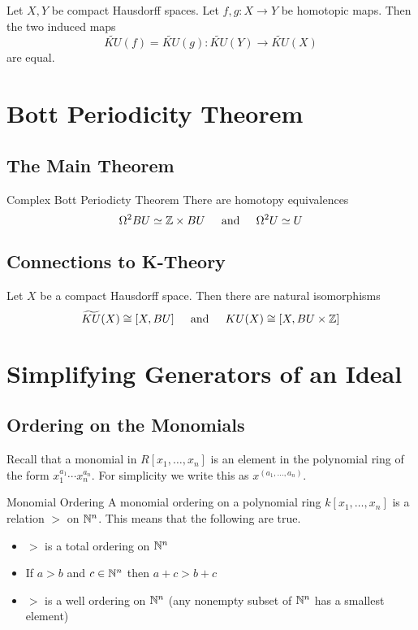 \documentclass[a4paper]{article}
\begin{document}
\begin{prp}{}{} Let $X,Y$ be compact Hausdorff spaces. Let $f,g:X\to Y$ be homotopic maps. Then the two induced maps $$\widetilde{KU}(f)=\widetilde{KU}(g):\widetilde{KU}(Y)\to\widetilde{KU}(X)$$ are equal. 
\end{prp}

\pagebreak
\section{Bott Periodicity Theorem}
\subsection{The Main Theorem}
\begin{thm}{Complex Bott Periodicty Theorem}{} There are homotopy equivalences $$\Omega^2 BU\simeq\mathbb{Z}\times BU\;\;\;\;\text{ and }\;\;\;\;\Omega^2 U\simeq U$$
\end{thm}

\subsection{Connections to K-Theory}
\begin{prp}{}{} Let $X$ be a compact Hausdorff space. Then there are natural isomorphisms $$\widetilde{KU}(X)\cong[X,BU]\;\;\;\;\text{ and }\;\;\;\; KU(X)\cong[X, BU\times\mathbb{Z}]$$
\end{prp}

\pagebreak
\section{Simplifying Generators of an Ideal}
\subsection{Ordering on the Monomials}
Recall that a monomial in $R[x_1,\dots,x_n]$ is an element in the polynomial ring of the form $x_1^{a_1}\cdots x_n^{a_n}$. For simplicity we write this as $x^{(a_1,\dots,a_n)}$. 

\begin{defn}{Monomial Ordering}{} A monomial ordering on a polynomial ring $k[x_1,\dots,x_n]$ is a relation $>$ on $\mathbb{N}^n$. This means that the following are true. 
\begin{itemize}
\item $>$ is a total ordering on $\mathbb{N}^n$
\item If $a>b$ and $c\in\mathbb{N}^n$ then $a+c>b+c$
\item $>$ is a well ordering on $\mathbb{N}^n$ (any nonempty subset of $\mathbb{N}^n$ has a smallest element)
\end{itemize}
\end{defn}
\end{document}
